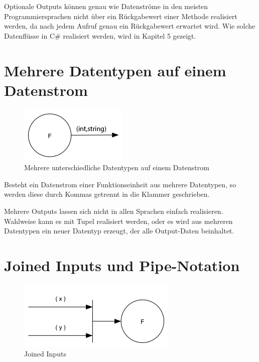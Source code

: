 Optionale Outputs können genau wie Datenströme in den meisten Programmiersprachen nicht über ein Rückgabewert einer
Methode realisiert werden, da nach jedem Aufruf genau ein Rückgabewert erwartet wird. Wie solche
Datenflüsse in C\# realisiert werden, wird in Kapitel 5 gezeigt.

\section{Mehrere Datentypen auf einem Datenstrom}


\begin{figure}[H]
	\centering
	\includegraphics[width=.5\linewidth]{./img/diagramIntString.png}
	\caption{Mehrere unterschiedliche Datentypen auf einem Datenstrom}
\end{figure}


Besteht ein Datenstrom einer Funktionseinheit aus mehrere Datentypen, so werden diese durch Kommas getrennt in die Klammer geschrieben.

Mehrere Outputs lassen sich nicht in allen Sprachen einfach realisieren.
Wahlweise kann es mit Tupel realisiert werden, oder es wird aus mehreren Datentypen ein 
neuer Datentyp erzeugt, der alle Output-Daten beinhaltet.

\section{Joined Inputs und Pipe-Notation}

\begin{figure}[H]
	\centering
	\includegraphics[width=.7\linewidth]{./img/diagramJoin.png}
	\caption{Joined Inputs}
\end{figure}



